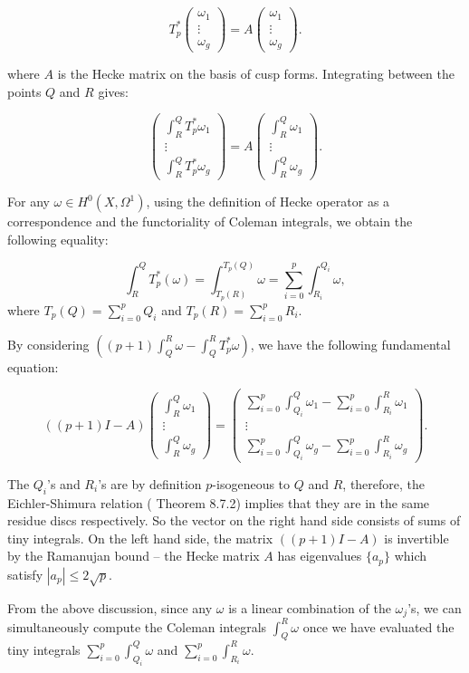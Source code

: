 \[T_p^*\begin{pmatrix} \omega_1 \\\vdots \\ \omega_g \end{pmatrix}  = A\begin{pmatrix} \omega_1 \\\vdots \\ \omega_g \end{pmatrix}.\]

where $A$ is the Hecke matrix on the basis of cusp forms. Integrating between the points $Q$ and $R$ gives:

\[\begin{pmatrix} \int^Q_RT_p^*\omega_1 \\\vdots \\ \int^Q_RT_p^*\omega_g \end{pmatrix}  = A\begin{pmatrix} \int^Q_R\omega_1 \\\vdots \\ \int^Q_R\omega_g \end{pmatrix}.\]


For any $\omega \in H^0(X,\Omega^1)$, using the definition of Hecke operator as a correspondence and the functoriality of Coleman integrals, we obtain the following equality:

\[\int^Q_R T_p^*(\omega) = \int^{T_p(Q)}_{T_p(R)} \omega = \sum_{i=0}^{p} \int^{Q_i}_{R_i} \omega,\] where $T_p(Q) = \sum_{i=0}^p Q_i$ and  $T_p(R) = \sum_{i=0}^p R_i$.

By considering $((p+1)\int_{Q}^R \omega - \int_Q^R T_p^* \omega)$, we have the following fundamental equation:

\begin{equation}\label{eq:fundamental-eqn}
   ((p+1)I-A)\begin{pmatrix} \int^Q_R\omega_1 \\\vdots \\ \int^Q_R\omega_g \end{pmatrix} =  \begin{pmatrix} \sum_{i=0}^{p}\int^Q_{Q_i} \omega_1 - \sum_{i=0}^{p}\int^R_{R_i} \omega_1 \\\vdots \\ \sum_{i=0}^{p}\int^Q_{Q_i} \omega_g - \sum_{i=0}^{p}\int^R_{R_i} \omega_g \end{pmatrix}.
\end{equation}

 The $Q_i$'s and $R_i$'s are by definition $p$-isogeneous to $Q$ and $R$, therefore, the Eichler-Shimura relation (\cite{Shurman} Theorem 8.7.2) implies that they are in the same residue discs respectively. So the vector on the right hand side consists of sums of tiny integrals. On the left hand side, the matrix $((p+1)I - A)$ is invertible by the Ramanujan bound -- the Hecke matrix $A$ has eigenvalues $\{a_p\}$ which satisfy $|a_p| \leq 2 \sqrt{p}$.

From the above discussion, since any $\omega$ is a linear combination of the $\omega_j$'s, we can simultaneously compute the Coleman integrals $\int_Q^R \omega$ once we have evaluated the tiny integrals $\sum_{i=0}^p \int_{Q_i}^Q \omega$ and $\sum_{i=0}^p \int_{R_i}^R \omega$.
